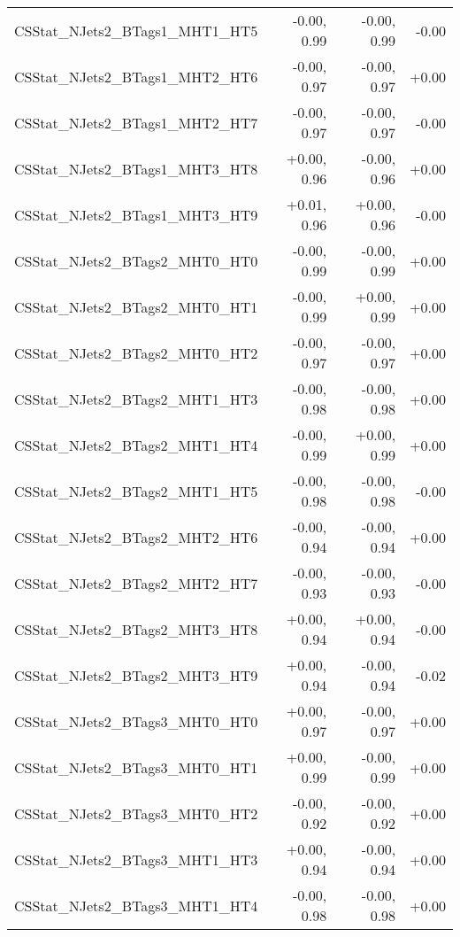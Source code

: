 \begin{tabular}{|l|r|r|r|}
CSStat\_NJets2\_BTags1\_MHT1\_HT5        &      -0.00, 0.99 &     -0.00, 0.99 &  -0.00 \\
CSStat\_NJets2\_BTags1\_MHT2\_HT6        &      -0.00, 0.97 &     -0.00, 0.97 &  +0.00 \\
CSStat\_NJets2\_BTags1\_MHT2\_HT7        &      -0.00, 0.97 &     -0.00, 0.97 &  -0.00 \\
CSStat\_NJets2\_BTags1\_MHT3\_HT8        &      +0.00, 0.96 &     -0.00, 0.96 &  +0.00 \\
CSStat\_NJets2\_BTags1\_MHT3\_HT9        &      +0.01, 0.96 &     +0.00, 0.96 &  -0.00 \\
CSStat\_NJets2\_BTags2\_MHT0\_HT0        &      -0.00, 0.99 &     -0.00, 0.99 &  +0.00 \\
CSStat\_NJets2\_BTags2\_MHT0\_HT1        &      -0.00, 0.99 &     +0.00, 0.99 &  +0.00 \\
CSStat\_NJets2\_BTags2\_MHT0\_HT2        &      -0.00, 0.97 &     -0.00, 0.97 &  +0.00 \\
CSStat\_NJets2\_BTags2\_MHT1\_HT3        &      -0.00, 0.98 &     -0.00, 0.98 &  +0.00 \\
CSStat\_NJets2\_BTags2\_MHT1\_HT4        &      -0.00, 0.99 &     +0.00, 0.99 &  +0.00 \\
CSStat\_NJets2\_BTags2\_MHT1\_HT5        &      -0.00, 0.98 &     -0.00, 0.98 &  -0.00 \\
CSStat\_NJets2\_BTags2\_MHT2\_HT6        &      -0.00, 0.94 &     -0.00, 0.94 &  +0.00 \\
CSStat\_NJets2\_BTags2\_MHT2\_HT7        &      -0.00, 0.93 &     -0.00, 0.93 &  -0.00 \\
CSStat\_NJets2\_BTags2\_MHT3\_HT8        &      +0.00, 0.94 &     +0.00, 0.94 &  -0.00 \\
CSStat\_NJets2\_BTags2\_MHT3\_HT9        &      +0.00, 0.94 &     -0.00, 0.94 &  -0.02 \\
CSStat\_NJets2\_BTags3\_MHT0\_HT0        &      +0.00, 0.97 &     -0.00, 0.97 &  +0.00 \\
CSStat\_NJets2\_BTags3\_MHT0\_HT1        &      +0.00, 0.99 &     -0.00, 0.99 &  +0.00 \\
CSStat\_NJets2\_BTags3\_MHT0\_HT2        &      -0.00, 0.92 &     -0.00, 0.92 &  +0.00 \\
CSStat\_NJets2\_BTags3\_MHT1\_HT3        &      +0.00, 0.94 &     -0.00, 0.94 &  +0.00 \\
CSStat\_NJets2\_BTags3\_MHT1\_HT4        &      -0.00, 0.98 &     -0.00, 0.98 &  +0.00 \\

\end{tabular}
